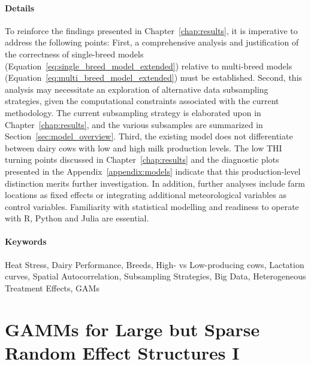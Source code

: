 \paragraph{Details} To reinforce the findings presented in Chapter~\ref{chap:results}, it is imperative to address the following points: First, a comprehensive analysis and justification of the correctness of single-breed models (Equation~\ref{eq:single_breed_model_extended}) relative to multi-breed models (Equation~\ref{eq:multi_breed_model_extended}) must be established. Second, this analysis may necessitate an exploration of alternative data subsampling strategies, given the computational constraints associated with the current methodology. The current subsampling strategy is elaborated upon in Chapter~\ref{chap:results}, and the various subsamples are summarized in Section~\ref{sec:model_overview}. Third, the existing model does not differentiate between dairy cows with low and high milk production levels. The low THI turning points discussed in Chapter~\ref{chap:results} and the diagnostic plots presented in the Appendix~\ref{appendix:models} indicate that this production-level distinction merits further investigation. In addition, further analyses include farm locations as fixed effects or integrating additional meteorological variables as control variables. Familiarity with statistical modelling and readiness to operate with R, Python and Julia are essential.

\paragraph{Keywords} Heat Stress, Dairy Performance, Breeds, High- vs Low-producing cows, Lactation curves, Spatial Autocorrelation, Subsampling Strategies, Big Data, Heterogeneous Treatment Effects, GAMs

\newpage

\section{GAMMs for Large but Sparse Random Effect Structures I}
